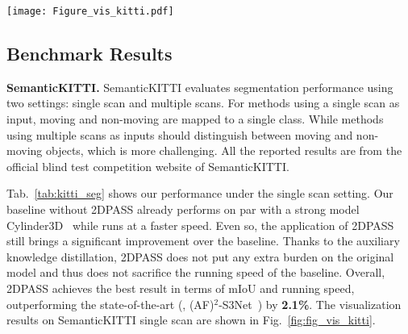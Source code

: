 \documentclass[runningheads]{llncs}
\begin{document}
	\begin{figure*}[t]
		\begin{centering}
			\texttt{[image: Figure\_vis\_kitti.pdf]}
			\caption{{Qualitative results of 2DPASS on the validation set of SemanticKITTI. Our baseline has a higher error recognizing small objects and region boundaries, while 2DPASS recognizes small objects better thanks to the prior of 2D modality.} 
			}
			\label{fig:fig_vis_kitti}
		\end{centering}	
	\end{figure*}
	
	
	
	\subsection{Benchmark Results}
	\noindent\textbf{SemanticKITTI.}
	SemanticKITTI evaluates segmentation performance using two settings: single scan and multiple scans.
For methods using a single scan as input, moving and non-moving are mapped to a single class. While methods using multiple scans as inputs should distinguish between moving and non-moving objects, which is more challenging.
All the reported results are from the official blind test competition website of SemanticKITTI.
	
	Tab.~\ref{tab:kitti_seg} shows our performance under the single scan setting.
Our baseline without 2DPASS already performs on par with a strong model Cylinder3D~\cite{zhou2020cylinder3d} while runs at a faster speed.
Even so, the application of 2DPASS still brings a significant improvement over the baseline.
Thanks to the auxiliary knowledge distillation,  2DPASS does not put any extra burden on the original model and thus does not sacrifice the running speed of the baseline.
Overall, 2DPASS achieves the best result in terms of mIoU and running speed, outperforming the state-of-the-art (\ie,  (AF)$^2$-S3Net~\cite{cheng20212}) by {\textbf{2.1\%}}.
The visualization results on SemanticKITTI single scan are shown in Fig.~\ref{fig:fig_vis_kitti}.
	
\end{document}
